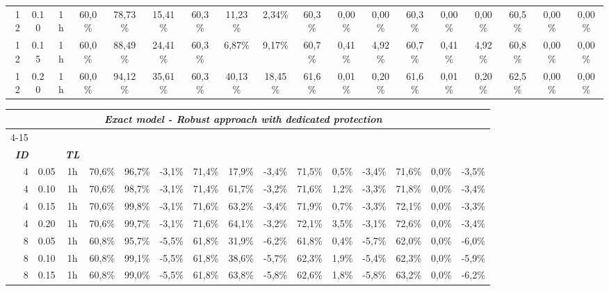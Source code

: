\documentclass[final,5p,times,twocolumn]{elsarticle}
\begin{document}
\begin{table*}[!htb]
\begin{tabular}{rccccccccccccccccc}
12 & 0.10 & 1h & 60,0\% & 78,73\% & 15,41\% & 60,3\% & 11,23\% &  2,34\% & 60,3\% & 0,00\% & 0,00\% & 60,3\% & 0,00\% & 0,00\% & 60,5\% & 0,00\% & 0,00\%\\ 
12 & 0.15 & 1h & 60,0\% & 88,49\% & 24,41\% & 60,3\% & 6,87\% &  9,17\% & 60,7\% & 0,41\% & 4,92\% & 60,7\% & 0,41\% & 4,92\% & 60,8\% & 0,00\% & 0,00\% \\ 
12 & 0.20 & 1h & 60,0\% & 94,12\% & 35,61\% & 60,3\% & 40,13\% & 18,45\% & 61,6\% & 0,01\% & 0,20\% & 61,6\% & 0,01\% & 0,20\% & 62,5\% & 0,00\% & 0,00\%\\ 
\end{tabular}
\caption{Robustness analysis  for the solutions obtained by the robust exact model with no protection  with 1h time limit on polska instances}
\label{tab:polska_model_robust}
\tabcolsep 6.3pt
\vspace{1cm}
\begin{tabular}{rcccccccccccccc}
& & \multicolumn{11}{c}{\textbf{\textit{Exact model - Robust approach with dedicated protection}}} \\
\cline{4-15}
& & & \multicolumn{3}{c}{\textbf{\textit{}}} & \multicolumn{3}{c}{\textbf{\textit{}}} & \multicolumn{3}{c}{\textbf{\textit{}}} & \multicolumn{3}{c}{\textbf{\textit{}}} \\ 
\hline
\textbf{\textit{ID}} & \textbf{\textit{}} & \textbf{\textit{TL}} & \textbf{\textit{}} &  &	 & \textbf{\textit{}} &  &  & \textbf{\textit{}} &  &  & \textbf{\textit{}} &  &  \\ 
\hline
4 & 0.05 & 1h &  70,6\% & 96,7\% & -3,1\% & 71,4\% & 17,9\% & -3,4\% & 71,5\% & 0,5\% & -3,4\% & 71,6\% & 0,0\% & -3,5\%  \\ 
4 & 0.10 & 1h &  70,6\% & 98,7\% & -3,1\% & 71,4\% & 61,7\% & -3,2\% & 71,6\% & 1,2\% & -3,3\% & 71,8\% & 0,0\% & -3,4\%  \\ 
4 & 0.15 & 1h &  70,6\% & 99,8\% & -3,1\% & 71,6\% & 63,2\% & -3,4\% & 71,9\% & 0,7\% & -3,3\% & 72,1\% & 0,0\% & -3,3\%  \\ 
4 & 0.20 & 1h &  70,6\% & 99,7\% & -3,1\% & 71,6\% & 64,1\% & -3,2\% & 72,1\% & 3,5\% & -3,1\% & 72,6\% & 0,0\% & -3,4\%  \\ 
8 & 0.05 & 1h &  60,8\% & 95,7\% & -5,5\% & 61,8\% & 31,9\% & -6,2\% & 61,8\% & 0,4\% & -5,7\% & 62,0\% & 0,0\% & -6,0\%  \\ 
8 & 0.10 & 1h &  60,8\% & 99,1\% & -5,5\% & 61,8\% & 38,6\% & -5,7\% & 62,3\% & 1,9\% & -5,4\% & 62,3\% & 0,0\% & -5,9\%  \\ 
8 & 0.15 & 1h &  60,8\% & 99,0\% & -5,5\% & 61,8\% & 63,8\% & -5,8\% & 62,6\% & 1,8\% & -5,8\% & 63,2\% & 0,0\% & -6,2\%  \\ 

\end{tabular}
\end{table*}
\end{document}
